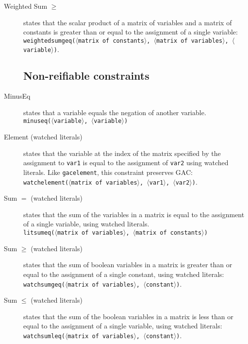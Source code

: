 \documentclass{article}
\begin{document}
\begin{small}
\begin{description}
\item[Weighted Sum $\mathbf{\geq}$] states that the scalar product of
a matrix of variables and a matrix of constants is greater than or
equal to the assignment of a single variable:\\
\texttt{weightedsumgeq($\langle$matrix of constants$\rangle$,
$\langle$matrix of variables$\rangle$, $\langle$variable$\rangle$)}.


\subsection{Non-reifiable constraints}

\item[MinusEq] states that a variable equals the negation of another variable.
\\
\texttt{minuseq($\langle$variable$\rangle$, $\langle$variable$\rangle$)}

\item[Element (watched literals)] states that the variable at the index of the matrix
specified by the assignment to \texttt{var1} is equal to the
assignment of \texttt{var2} using watched literals.  Like \texttt{gacelement}, this constraint preserves GAC:\\ 
\texttt{watchelement($\langle$matrix of
variables$\rangle$, $\langle$var1$\rangle$, $\langle$var2$\rangle$)}.

\item[Sum $\mathbf{=}$ (watched literals)] states that the sum of the variables in a
matrix is equal to the assignment of a single variable, using watched literals. \\
\texttt{litsumeq($\langle$matrix of variables$\rangle$, $\langle$matrix of constants$\rangle$)}


\item[Sum $\mathbf{\geq}$ (watched literals)] states that the sum of boolean variables in a
matrix is greater than or equal to the assignment of a single
constant, using watched literals:\\ \texttt{watchsumgeq($\langle$matrix of variables$\rangle$,
$\langle$constant$\rangle$)}.

\item[Sum $\mathbf{\leq}$ (watched literals)] states that the sum of
  the boolean variables in a
matrix is less than or equal to the assignment of a single variable, using watched literals:\\
\texttt{watchsumleq($\langle$matrix of variables$\rangle$,
$\langle$constant$\rangle$)}.


\end{description}
\end{small}
\end{document}
